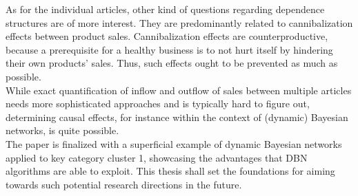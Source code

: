 As for the individual articles, other kind of questions regarding dependence structures are of more interest. They are predominantly related to cannibalization effects between product sales. Cannibalization effects are counterproductive, because a prerequisite for a healthy business is to not hurt itself by hindering their own products' sales. Thus, such effects ought to be prevented as much as possible.\\
 While exact quantification of inflow and outflow of sales between multiple articles needs more sophisticated approaches and is typically hard to figure out, determining causal effects, for instance within the context of (dynamic) Bayesian networks, is quite possible. \\
The paper is finalized with a superficial example of dynamic Bayesian networks applied to key category cluster 1, showcasing the advantages that \ac{DBN} algorithms are able to exploit. This thesis shall set the foundations for aiming towards such potential research directions in the future.





















